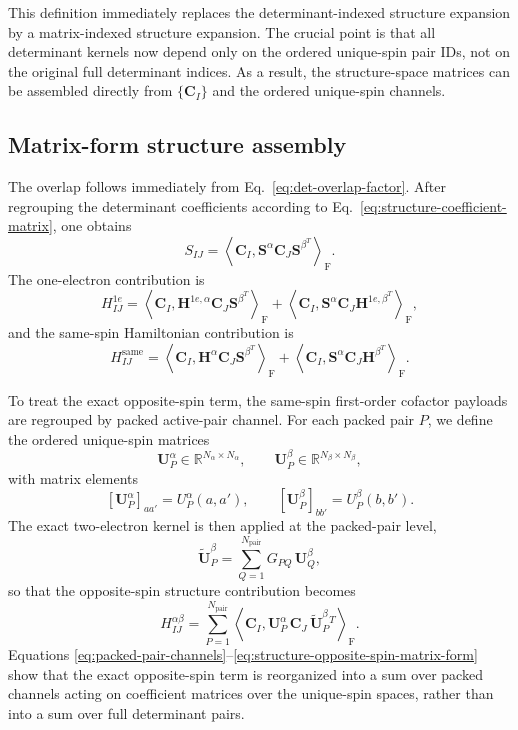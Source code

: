 \documentclass[journal=jctcce,manuscript=article]{achemso}
\newcommand{\Frob}[2]{\left\langle #1, #2 \right\rangle_{\mathrm F}}
\newcommand{\na}{N_{\alpha}}
\newcommand{\nb}{N_{\beta}}
\newcommand{\npair}{N_{\mathrm{pair}}}
\newcommand{\Cmat}{\mathbf{C}}
\newcommand{\Sa}{\mathbf{S}^{\alpha}}
\newcommand{\Sb}{\mathbf{S}^{\beta}}
\newcommand{\Ha}{\mathbf{H}^{\alpha}}
\newcommand{\Hb}{\mathbf{H}^{\beta}}
\newcommand{\Honea}{\mathbf{H}^{1e,\alpha}}
\newcommand{\Honeb}{\mathbf{H}^{1e,\beta}}
\newcommand{\Ua}[1]{\mathbf{U}^{\alpha}_{#1}}
\newcommand{\Ub}[1]{\widetilde{\mathbf{U}}^{\beta}_{#1}}
\begin{document}
This definition immediately replaces the determinant-indexed structure
expansion by a matrix-indexed structure expansion. The crucial point is that
all determinant kernels now depend only on the ordered unique-spin pair IDs,
not on the original full determinant indices. As a result, the structure-space
matrices can be assembled directly from $\{ \Cmat_I \}$ and the ordered
unique-spin channels.

\subsection{Matrix-form structure assembly}
The overlap follows immediately from Eq.~\eqref{eq:det-overlap-factor}. After
regrouping the determinant coefficients according to
Eq.~\eqref{eq:structure-coefficient-matrix}, one obtains
\begin{equation}
S_{IJ}
=
\Frob{\Cmat_I}{\Sa \Cmat_J \Sb^{T}}.
\label{eq:structure-overlap-matrix-form}
\end{equation}
The one-electron contribution is
\begin{equation}
H^{1e}_{IJ}
=
\Frob{\Cmat_I}{\Honea \Cmat_J \Sb^{T}}
+
\Frob{\Cmat_I}{\Sa \Cmat_J \Honeb^{T}},
\label{eq:structure-h1-matrix-form}
\end{equation}
and the same-spin Hamiltonian contribution is
\begin{equation}
H^{\mathrm{same}}_{IJ}
=
\Frob{\Cmat_I}{\Ha \Cmat_J \Sb^{T}}
+
\Frob{\Cmat_I}{\Sa \Cmat_J \Hb^{T}}.
\label{eq:structure-same-matrix-form}
\end{equation}

To treat the exact opposite-spin term, the same-spin first-order cofactor
payloads are regrouped by packed active-pair channel. For each packed pair
$P$, we define the ordered unique-spin matrices
\begin{equation}
\Ua{P} \in \mathbb{R}^{\na \times \na},
\qquad
\mathbf{U}^{\beta}_{P} \in \mathbb{R}^{\nb \times \nb},
\label{eq:packed-pair-channels}
\end{equation}
with matrix elements
\begin{equation}
\left[\Ua{P}\right]_{aa'} = U^\alpha_P(a,a'),
\qquad
\left[\mathbf{U}^{\beta}_{P}\right]_{bb'} = U^\beta_P(b,b').
\label{eq:packed-pair-channel-elements}
\end{equation}
The exact two-electron kernel is then applied at the packed-pair level,
\begin{equation}
\Ub{P} =
\sum_{Q=1}^{\npair}
G_{PQ}\, \mathbf{U}^{\beta}_{Q},
\label{eq:beta-projected-channel}
\end{equation}
so that the opposite-spin structure contribution becomes
\begin{equation}
H^{\alpha\beta}_{IJ}
=
\sum_{P=1}^{\npair}
\Frob{\Cmat_I}{\Ua{P}\, \Cmat_J\, \Ub{P}^{T}}.
\label{eq:structure-opposite-spin-matrix-form}
\end{equation}
Equations \eqref{eq:packed-pair-channels}--\eqref{eq:structure-opposite-spin-matrix-form}
show that the exact opposite-spin term is reorganized into a sum over packed
channels acting on coefficient matrices over the unique-spin spaces, rather
than into a sum over full determinant pairs.
\end{document}
